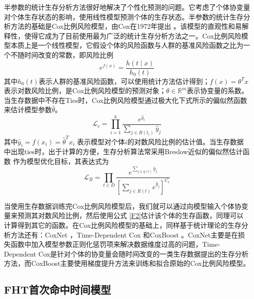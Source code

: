 半参数的统计生存分析方法很好地解决了个性化预测的问题。它考虑了个体协变量对个体生存状态的影响，使用线性模型预测个体的生存状态。半参数的统计生存分析方法的基础是Cox比例风险模型，由Cox在1972年提出 。该模型的直观性和易解释性，使得它成为了目前使用最为广泛的统计生存分析方法之一。Cox比例风险模型本质上是一个线性模型，它假设个体的风险函数与人群的基准风险函数之比为一个不随时间改变的常数，即风险比例
\begin{equation}
e^{f(x)} =\frac{h(t\mid x)}{h_0 (t)} \label{F4}
\end{equation}
其中$h_0 (t)$表示人群的基准风险函数，可以使用统计方法估计得到；$f(x)=\theta^T x$表示对数风险比例，是Cox比例风险模型的预测对象；$\theta \in \mathbb{R}^m$表示协变量的系数。当生存数据中不存在Ties时，Cox比例风险模型通过极大化下式所示的偏似然函数 来估计模型参数$\hat{\theta}$。
\begin{equation}
\mathcal{L}_c = \prod_{i=1}^k \frac{e^{\hat{y}_i}}{\sum_{j\in R(t_i)} \hat{y}_j} \label{F5}
\end{equation}
其中$\hat{y}_i=f(x_i)=\hat{\theta}^T x_i$ 表示模型对个体$i$的对数风险比例的估计值。当生存数据中出现ties时，出于计算的方便，生存分析算法常采用Breslow近似的偏似然估计函数 作为模型优化目标，其表达式为
\begin{equation}
\mathcal{L}_B = \prod_{t\in D} \frac{e^{\sum_{j\in q(t)} \hat{y}_j}}{[\sum_{j\in R(t)} e^{\hat{y}_j}]^{C_t}} \label{F6}
\end{equation}

当使用生存数据训练完Cox比例风险模型后，我们就可以通过向模型输入个体协变量来预测其对数风险比例，然后使用公式 \eqref{F2}估计该个体的生存函数，同理可以计算得到其它的函数。在Cox比例风险模型的基础上，同样基于统计理论的生存分析方法还有：CoxNet ，Time-Dependent Cox 和CoxBoost 。CoxNet主要是在损失函数中加入模型参数正则化惩罚项来解决数据维度过高的问题，Time-Dependent Cox是针对个体的协变量会随时间改变的一类生存数据提出的生存分析方法，而CoxBoost主要使用梯度提升方法来训练和拟合原始的Cox比例风险模型。

\subsection{FHT首次命中时间模型}

